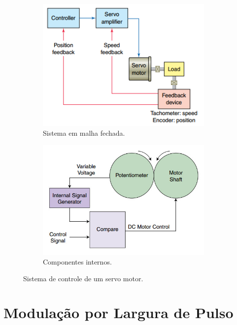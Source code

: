 \begin{figure}[h]
	\centering
	\begin{subfigure}{.5\textwidth}
		\includegraphics[width=0.95\textwidth]{figuras/servo_closed_loop.png}
		\caption{Sistema em malha fechada.}
		\label{fig:servo_closed_loop}
	\end{subfigure}%
	\begin{subfigure}{.5\textwidth}
		\includegraphics[width=0.95\textwidth]{figuras/inside_a_servo.jpg}
		\caption{Componentes internos.}
		\label{fig:insideaservo}
	\end{subfigure}
	\caption{Sistema de controle de um servo motor.}
\end{figure}

\section{Modulação por Largura de Pulso}
\label{sec:pwm}

